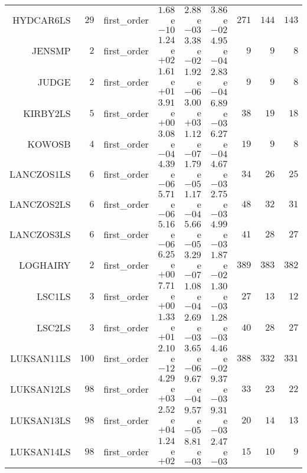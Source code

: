 \begin{longtable}{rrrrrrrrr}
HYDCAR6LS & \(    29\) & first\_order & \( 1.68\)e\(-10\) & \( 2.88\)e\(-03\) & \( 3.86\)e\(-02\) & \(   271\) & \(   144\) & \(   143\) \\
JENSMP & \(     2\) & first\_order & \( 1.24\)e\(+02\) & \( 3.38\)e\(-02\) & \( 4.95\)e\(-04\) & \(     9\) & \(     9\) & \(     8\) \\
JUDGE & \(     2\) & first\_order & \( 1.61\)e\(+01\) & \( 1.92\)e\(-06\) & \( 2.83\)e\(-04\) & \(     9\) & \(     9\) & \(     8\) \\
KIRBY2LS & \(     5\) & first\_order & \( 3.91\)e\(+00\) & \( 3.00\)e\(+03\) & \( 6.89\)e\(-03\) & \(    38\) & \(    19\) & \(    18\) \\
KOWOSB & \(     4\) & first\_order & \( 3.08\)e\(-04\) & \( 1.12\)e\(-07\) & \( 6.27\)e\(-04\) & \(    19\) & \(     9\) & \(     8\) \\
LANCZOS1LS & \(     6\) & first\_order & \( 4.39\)e\(-06\) & \( 1.79\)e\(-05\) & \( 4.67\)e\(-03\) & \(    34\) & \(    26\) & \(    25\) \\
LANCZOS2LS & \(     6\) & first\_order & \( 5.71\)e\(-06\) & \( 1.17\)e\(-04\) & \( 2.75\)e\(-03\) & \(    48\) & \(    32\) & \(    31\) \\
LANCZOS3LS & \(     6\) & first\_order & \( 5.16\)e\(-06\) & \( 5.66\)e\(-05\) & \( 4.99\)e\(-03\) & \(    41\) & \(    28\) & \(    27\) \\
LOGHAIRY & \(     2\) & first\_order & \( 6.25\)e\(+00\) & \( 3.29\)e\(-07\) & \( 1.87\)e\(-02\) & \(   389\) & \(   383\) & \(   382\) \\
LSC1LS & \(     3\) & first\_order & \( 7.71\)e\(+00\) & \( 1.08\)e\(-04\) & \( 1.30\)e\(-03\) & \(    27\) & \(    13\) & \(    12\) \\
LSC2LS & \(     3\) & first\_order & \( 1.33\)e\(+01\) & \( 2.69\)e\(-03\) & \( 1.28\)e\(-03\) & \(    40\) & \(    28\) & \(    27\) \\
LUKSAN11LS & \(   100\) & first\_order & \( 2.10\)e\(-12\) & \( 3.65\)e\(-06\) & \( 4.46\)e\(-02\) & \(   388\) & \(   332\) & \(   331\) \\
LUKSAN12LS & \(    98\) & first\_order & \( 4.29\)e\(+03\) & \( 9.67\)e\(-04\) & \( 9.37\)e\(-03\) & \(    33\) & \(    23\) & \(    22\) \\
LUKSAN13LS & \(    98\) & first\_order & \( 2.52\)e\(+04\) & \( 9.57\)e\(-05\) & \( 9.31\)e\(-03\) & \(    20\) & \(    14\) & \(    13\) \\
LUKSAN14LS & \(    98\) & first\_order & \( 1.24\)e\(+02\) & \( 8.81\)e\(-03\) & \( 2.47\)e\(-03\) & \(    15\) & \(    10\) & \(     9\) \\

\end{longtable}
